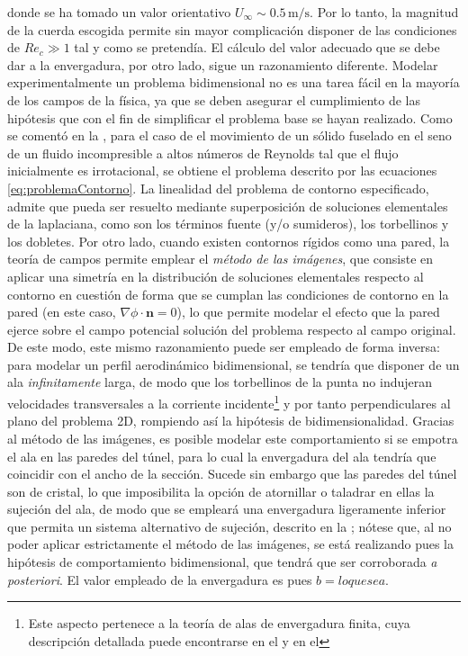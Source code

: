 donde se ha tomado un valor orientativo $U_{\infty} \sim 0.5\,\mathrm{m/s}$. Por lo tanto, la magnitud de la cuerda escogida permite sin mayor complicación disponer de las condiciones de $Re_{c} \gg 1$ tal y como se pretendía. El cálculo del valor adecuado que se debe dar a la envergadura, por otro lado, sigue un razonamiento diferente. Modelar experimentalmente un problema bidimensional no es una tarea fácil en la mayoría de los campos de la física, ya que se deben asegurar el cumplimiento de las hipótesis que con el fin de simplificar el problema base se hayan realizado. Como se comentó en la , para el caso de el movimiento de un sólido fuselado en el seno de un fluido incompresible a altos números de Reynolds tal que el flujo inicialmente es irrotacional, se obtiene el problema descrito por las ecuaciones \eqref{eq:problemaContorno}. La linealidad del problema de contorno especificado, admite que pueda ser resuelto mediante superposición de soluciones elementales de la laplaciana, como son los términos fuente (y/o sumideros), los torbellinos y los dobletes. %
Por otro lado, cuando existen contornos rígidos como una pared, la teoría de campos permite emplear el \emph{método de las imágenes}, que consiste en aplicar una simetría en la distribución de soluciones elementales respecto al contorno en cuestión de forma que se cumplan las condiciones de contorno en la pared (en este caso, $\nabla \phi \cdot \mathbf{n} = 0$), lo que permite modelar el efecto que la pared ejerce sobre el campo potencial solución del problema respecto al campo original. De este modo, este mismo razonamiento puede ser empleado de forma inversa: para modelar un perfil aerodinámico bidimensional, se tendría que disponer de un ala \emph{infinitamente} larga, de modo que los torbellinos de la punta no indujeran velocidades transversales a la corriente incidente\footnote{Este aspecto pertenece a la teoría de alas de envergadura finita, cuya descripción detallada puede encontrarse en el   y  en el %
} y por tanto perpendiculares al plano del problema 2D, rompiendo así la hipótesis de bidimensionalidad. Gracias al método de las imágenes, es posible modelar este  comportamiento si se empotra el ala en las paredes del túnel, para lo cual la envergadura del ala tendría que coincidir con el ancho de la sección. Sucede sin embargo que las paredes del túnel son de cristal, lo que imposibilita la opción de atornillar o taladrar en ellas la sujeción del ala, de modo que se empleará una envergadura ligeramente inferior que permita un sistema alternativo de sujeción, descrito en la ; nótese que, al no poder aplicar estrictamente el método de las imágenes, se está realizando pues la hipótesis de comportamiento bidimensional, que tendrá que ser corroborada \textit{a posteriori}. El valor empleado de la envergadura es pues $b = lo que sea$.

